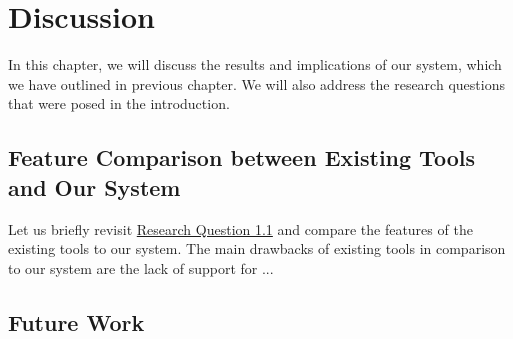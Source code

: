 \documentclass[../thesis.tex]{subfiles}
\begin{document}
    \chapter{Discussion}\label{ch:discussion}
    In this chapter, we will discuss the results and implications of our system, which we have outlined in previous chapter. We will also address the research questions that were posed in the introduction.

    \section{Feature Comparison between Existing Tools and Our System}\label{sec:feature-comparison}
    Let us briefly revisit \href{RQ1.1}{Research Question 1.1} and compare the features of the existing tools to our system. The main drawbacks of existing tools in comparison to our system are the lack of support for ...
    \lipsum[1]

    \section{Future Work}\label{sec:future-work}

    \ifSubfilesClassLoaded{%
        \printbibliography{}%
    }{}
\end{document}
